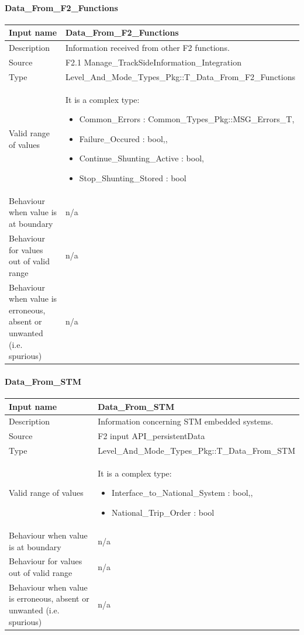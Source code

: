 \paragraph{Data\_From\_F2\_Functions}

\begin{longtable}{p{}p{}}
\toprule
Input name				& Data\_From\_F2\_Functions \\
\midrule
Description				& Information received from other F2 functions. \\
\midrule
Source					& F2.1 Manage\_TrackSideInformation\_Integration\\ 
\midrule
Type					& Level\_And\_Mode\_Types\_Pkg::T\_Data\_From\_F2\_Functions \\
\midrule
Valid range of values	& It is a complex type:
\begin{itemize}
\item Common\_Errors : Common\_Types\_Pkg::MSG\_Errors\_T, 
\item Failure\_Occured : bool,, 
\item Continue\_Shunting\_Active : bool, 
\item  Stop\_Shunting\_Stored : bool
\end{itemize} \\
\midrule
Behaviour when value is at boundary	& n/a \\ 
\midrule
Behaviour for values out of valid range	& n/a \\ 
\midrule
Behaviour when value is erroneous, absent or unwanted (i.e. spurious) & n/a \\ 
\bottomrule
\end{longtable}



\paragraph{Data\_From\_STM}

\begin{longtable}{p{}p{}}
\toprule
Input name				& Data\_From\_STM \\
\midrule
Description				& Information concerning STM embedded systems. \\
\midrule
Source					& F2 input API\_persistentData\\ 
\midrule
Type					& Level\_And\_Mode\_Types\_Pkg::T\_Data\_From\_STM \\
\midrule
Valid range of values	& It is a complex type:
\begin{itemize}
\item Interface\_to\_National\_System : bool,, 
\item  National\_Trip\_Order : bool
\end{itemize} \\
\midrule
Behaviour when value is at boundary	& n/a \\ 
\midrule
Behaviour for values out of valid range	& n/a \\ 
\midrule
Behaviour when value is erroneous, absent or unwanted (i.e. spurious) & n/a \\ 
\bottomrule
\end{longtable}



